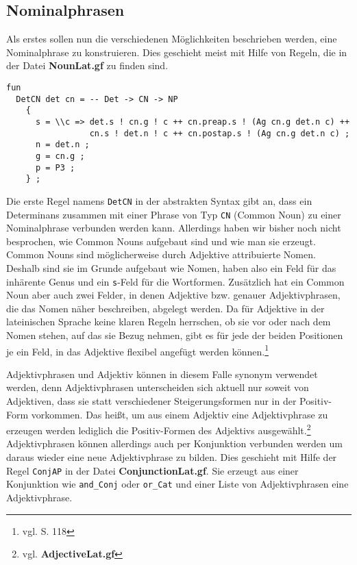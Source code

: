 \documentclass[fontsize=12pt,abstract=on,titlepage,bibliography=totoc,ngerman,listof=totoc]{scrreprt}
\begin{document}
\subsection{Nominalphrasen}
\label{subsec:nominalphrasen}
Als erstes sollen nun die verschiedenen Möglichkeiten beschrieben werden, eine Nominalphrase zu konstruieren. Dies geschieht meist mit Hilfe von Regeln, die in der Datei \textbf{NounLat.gf} zu finden sind. \par
\begin{lstlisting}[float=ht,caption={Die Syntaxregel \texttt{DetCN}},label={GF-Noun-DetCN}]
fun
  DetCN det cn = -- Det -> CN -> NP
    {
      s = \\c => det.s ! cn.g ! c ++ cn.preap.s ! (Ag cn.g det.n c) ++ 
                 cn.s ! det.n ! c ++ cn.postap.s ! (Ag cn.g det.n c) ; 
      n = det.n ;  
      g = cn.g ; 
      p = P3 ;
    } ;
\end{lstlisting}
Die erste Regel namens \texttt{DetCN} in der abstrakten Syntax gibt an, dass ein Determinans zusammen mit einer Phrase von Typ \texttt{CN} (Common Noun) zu einer Nominalphrase verbunden werden kann. Allerdings haben wir bisher noch nicht besprochen, wie Common Nouns aufgebaut sind und wie man sie erzeugt. Common Nouns sind möglicherweise durch Adjektive attribuierte Nomen. Deshalb sind sie im Grunde aufgebaut wie Nomen, haben also ein Feld für das inhärente Genus und ein \texttt{s}-Feld für die Wortformen. Zusätzlich hat ein Common Noun aber auch zwei Felder, in denen Adjektive bzw. genauer Adjektivphrasen, die das Nomen näher beschreiben, abgelegt werden. Da für Adjektive in der lateinischen Sprache keine klaren Regeln herrschen, ob sie vor oder nach dem Nomen stehen, auf das sie Bezug nehmen, gibt es für jede der beiden Positionen je ein Feld, in das Adjektive flexibel angefügt werden können.\footnote{vgl. \cite{BAYER-LINDAUER1994} S. 118} \par
Adjektivphrasen und Adjektiv können in diesem Falle synonym verwendet werden, denn Adjektivphrasen unterscheiden sich aktuell nur soweit von Adjektiven, dass sie statt verschiedener Steigerungsformen nur in der Positiv-Form vorkommen. Das heißt, um aus einem Adjektiv eine Adjektivphrase zu erzeugen werden lediglich die Positiv-Formen des Adjektivs ausgewählt.\footnote{vgl. \textbf{AdjectiveLat.gf}} Adjektivphrasen können allerdings auch per Konjunktion verbunden werden um daraus wieder eine neue Adjektivphrase zu bilden. Dies geschieht mit Hilfe der Regel \texttt{ConjAP} in der Datei \textbf{ConjunctionLat.gf}. Sie erzeugt aus einer Konjunktion wie \texttt{and\_Conj} oder \texttt{or\_Cat} und einer Liste von Adjektivphrasen eine Adjektivphrase. \par
\end{document}

